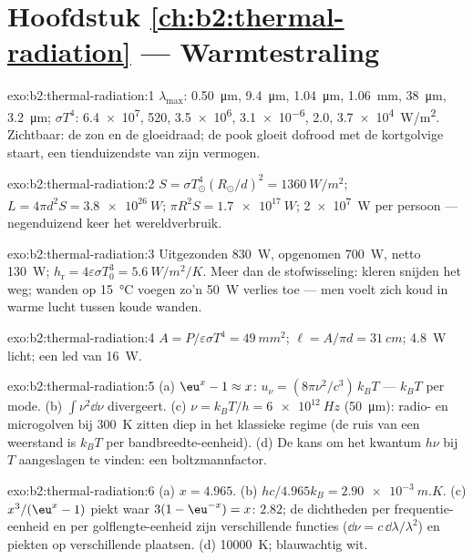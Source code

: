 \section*{Hoofdstuk \ref{ch:b2:thermal-radiation} --- Warmtestraling}

\begin{solution}{exo:b2:thermal-radiation:1}
$\lambda_{\max}$: \qty{0.50}{\micro m}, \qty{9.4}{\micro m}, \qty{1.04}{\micro m},
\qty{1.06}{mm}, \qty{38}{\micro m}, \qty{3.2}{\micro m}; $\sigma T^4$:
\qty{6.4e7}{},
\qty{520}{}, \qty{3.5e6}{}, \qty{3.1e-6}{}, \qty{2.0}{}, \qty{3.7e4}{W/m^2}.
Zichtbaar:
de zon en de gloeidraad; de pook gloeit dofrood met de kortgolvige
staart, een tienduizendste van zijn vermogen.
\end{solution}

\begin{solution}{exo:b2:thermal-radiation:2}
$S = \sigma T_\odot^4(R_\odot/d)^2 = \qty{1360}{W/m^2}$;
$L = 4\pi d^2S =
\qty{3.8e26}{W}$; $\pi R^2S = \qty{1.7e17}{W}$;
\qty{2e7}{W} per persoon --- negen\-duizend
keer het wereldverbruik.
\end{solution}

\begin{solution}{exo:b2:thermal-radiation:3}
Uitgezonden \qty{830}{W}, opgenomen \qty{700}{W}, netto \qty{130}{W};
$h_{\text{r}} =
4\varepsilon\sigma T_0^3 = \qty{5.6}{W/m^2/K}$. Meer dan de
stofwisseling:
kleren snijden het weg; wanden op \qty{15}{\celsius} voegen zo'n \qty{50}{W}
verlies toe
--- men voelt zich koud in warme lucht tussen koude wanden.
\end{solution}

\begin{solution}{exo:b2:thermal-radiation:4}
$A = P/\varepsilon\sigma T^4 = \qty{49}{mm^2}$; $\ell = A/\pi d = \qty{31}{cm}$;
\qty{4.8}{W} licht; een led van \qty{16}{W}.
\end{solution}

\begin{solution}{exo:b2:thermal-radiation:5}
(a) $\eu^x - 1 \approx x$: $u_\nu = (8\pi\nu^2/c^3)\,k_BT$ --- $k_BT$ per mode.
(b) $\int\nu^2\dd\nu$ divergeert. (c) $\nu = k_BT/h = \qty{6e12}{Hz}$
(\qty{50}{\micro m}):
radio- en microgolven bij \qty{300}{K} zitten diep in het klassieke regime (de
ruis van een weerstand is $k_BT$ per bandbreedte-eenheid). (d) De kans om
het kwantum $h\nu$ bij $T$ aangeslagen te vinden: een boltzmannfactor.
\end{solution}

\begin{solution}{exo:b2:thermal-radiation:6}
(a) $x = 4.965$. (b) $hc/4.965k_B = \qty{2.90e-3}{m.K}$. (c) $x^3/(\eu^x - 1)$
piekt waar $3(1 - \eu^{-x}) = x$: $2.82$; de dichtheden per frequentie-eenheid
en per golflengte-eenheid zijn verschillende functies
($\dd\nu = c\,\dd\lambda/\lambda^2$)
en piekten op verschillende plaatsen. (d) \qty{10000}{K}; blauwachtig wit.
\end{solution}

